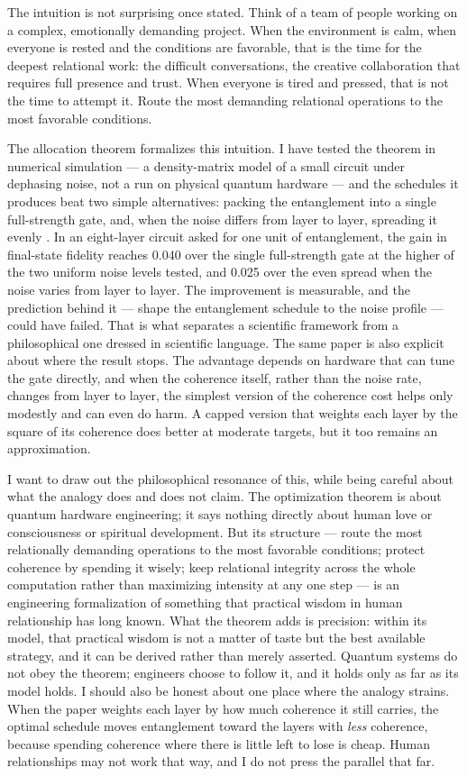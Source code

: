 The intuition is not surprising once stated. Think of a team of people working on a complex, emotionally demanding project. When the environment is calm, when everyone is rested and the conditions are favorable, that is the time for the deepest relational work: the difficult conversations, the creative collaboration that requires full presence and trust. When everyone is tired and pressed, that is not the time to attempt it. Route the most demanding relational operations to the most favorable conditions.

The allocation theorem formalizes this intuition. I have tested the theorem in numerical simulation --- a density-matrix model of a small circuit under dephasing noise, not a run on physical quantum hardware --- and the schedules it produces beat two simple alternatives: packing the entanglement into a single full-strength gate, and, when the noise differs from layer to layer, spreading it evenly \citep{AdamsRCT}. In an eight-layer circuit asked for one unit of entanglement, the gain in final-state fidelity reaches 0.040 over the single full-strength gate at the higher of the two uniform noise levels tested, and 0.025 over the even spread when the noise varies from layer to layer. The improvement is measurable, and the prediction behind it --- shape the entanglement schedule to the noise profile --- could have failed. That is what separates a scientific framework from a philosophical one dressed in scientific language. The same paper is also explicit about where the result stops. The advantage depends on hardware that can tune the gate directly, and when the coherence itself, rather than the noise rate, changes from layer to layer, the simplest version of the coherence cost helps only modestly and can even do harm. A capped version that weights each layer by the square of its coherence does better at moderate targets, but it too remains an approximation.

I want to draw out the philosophical resonance of this, while being careful about what the analogy does and does not claim. The optimization theorem is about quantum hardware engineering; it says nothing directly about human love or consciousness or spiritual development. But its structure --- route the most relationally demanding operations to the most favorable conditions; protect coherence by spending it wisely; keep relational integrity across the whole computation rather than maximizing intensity at any one step --- is an engineering formalization of something that practical wisdom in human relationship has long known. What the theorem adds is precision: within its model, that practical wisdom is not a matter of taste but the best available strategy, and it can be derived rather than merely asserted. Quantum systems do not obey the theorem; engineers choose to follow it, and it holds only as far as its model holds. I should also be honest about one place where the analogy strains. When the paper weights each layer by how much coherence it still carries, the optimal schedule moves entanglement toward the layers with \emph{less} coherence, because spending coherence where there is little left to lose is cheap. Human relationships may not work that way, and I do not press the parallel that far.



